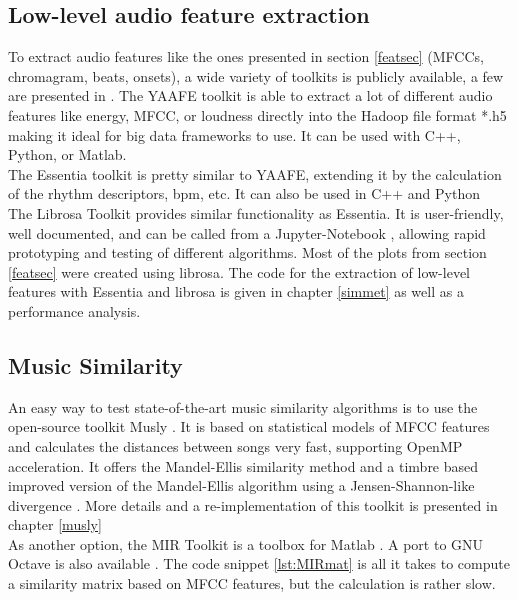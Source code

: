 \subsection{Low-level audio feature extraction}
To extract audio features like the ones presented in section \ref{featsec} (MFCCs, chromagram, beats, onsets), a wide variety of toolkits is publicly available, a few are presented in \cite{audiofeattoolb}.
The YAAFE toolkit \cite{yaafe1} is able to extract a lot of different audio features like energy, MFCC, or loudness directly into the Hadoop file format *.h5 making it ideal for big data frameworks to use. It can be used with C++, Python, or Matlab.\\
The Essentia toolkit \cite{essentia1} is pretty similar to YAAFE, extending it by the calculation of the rhythm descriptors, bpm, etc. It can also be used in C++ and Python\\
The Librosa Toolkit provides similar functionality \cite{labrosa1} as Essentia. It is user-friendly, well documented, and can be called from a Jupyter-Notebook \cite{jupyter}, allowing rapid prototyping and testing of different algorithms. Most of the plots from section \ref{featsec} were created using librosa. The code for the extraction of low-level features with Essentia and librosa is given in chapter \ref{simmet} as well as a performance analysis.\\

\subsection{Music Similarity}

An easy way to test state-of-the-art music similarity algorithms is to use the open-source toolkit Musly \cite{musly1}. It is based on statistical models of MFCC features and calculates the distances between songs very fast, supporting OpenMP acceleration. It offers the Mandel-Ellis similarity method \cite{mandelellis1} and a timbre based improved version of the Mandel-Ellis algorithm using a Jensen-Shannon-like divergence \cite{musly2}. More details and a re-implementation of this toolkit is presented in chapter \ref{musly}\\
As another option, the MIR Toolkit \cite{mirtoolbox1} is a toolbox for Matlab \cite{matl1}. A port to GNU Octave \cite{octave1} is also available \cite{mirtoolbox2}. The code snippet \ref{lst:MIRmat} is all it takes to compute a similarity matrix based on MFCC features, but the calculation is rather slow.

